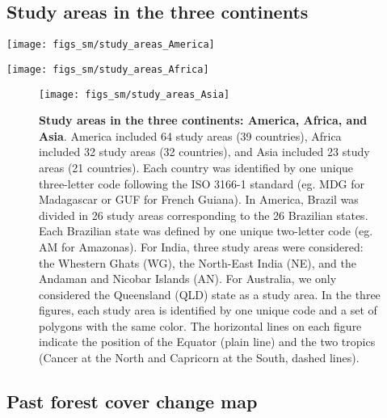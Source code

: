 \documentclass[
  12pt,
]{article}
\begin{document}
\hypertarget{study-areas-in-the-three-continents}{%
\subsection{Study areas in the three continents}\label{study-areas-in-the-three-continents}}



\begin{center}\texttt{[image: figs\_sm/study\_areas\_America]} \end{center}

\begin{center}\texttt{[image: figs\_sm/study\_areas\_Africa]} \end{center}

\begin{figure}[H]

{\centering \texttt{[image: figs\_sm/study\_areas\_Asia]} 

}

\caption{\textbf{Study areas in the three continents: America, Africa, and Asia}. America included 64 study areas (39 countries), Africa included 32 study areas (32 countries), and Asia included 23 study areas (21 countries). Each country was identified by one unique three-letter code following the ISO 3166-1 standard (eg. MDG for Madagascar or GUF for French Guiana). In America, Brazil was divided in 26 study areas corresponding to the 26 Brazilian states. Each Brazilian state was defined by one unique two-letter code (eg. AM for Amazonas). For India, three study areas were considered: the Whestern Ghats (WG), the North-East India (NE), and the Andaman and Nicobar Islands (AN). For Australia, we only considered the Queensland (QLD) state as a study area. In the three figures, each study area is identified by one unique code and a set of polygons with the same color. The horizontal lines on each figure indicate the position of the Equator (plain line) and the two tropics (Cancer at the North and Capricorn at the South, dashed lines).}\label{fig:study-areas}
\end{figure}

\hypertarget{past-forest-cover-change-map}{%
\subsection{Past forest cover change map}\label{past-forest-cover-change-map}}
\end{document}
